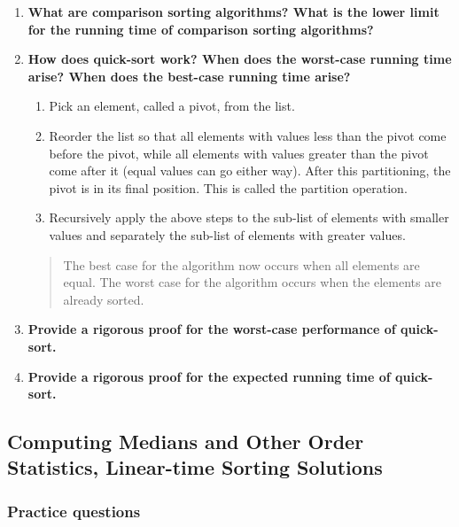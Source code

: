 \documentclass[a4paper,11pt]{article}
\begin{document}
\begin{enumerate}
\def\labelenumi{\arabic{enumi}.}
\item
  \textbf{What are comparison sorting algorithms? What is the lower
  limit for the running time of comparison sorting algorithms?}
\item
  \textbf{How does quick-sort work? When does the worst-case running
  time arise? When does the best-case running time arise?}

  \begin{enumerate}
  \def\labelenumii{\arabic{enumii}.}
  \itemsep1pt\parskip0pt
  \item
    Pick an element, called a pivot, from the list.
  \item
    Reorder the list so that all elements with values less than the
    pivot come before the pivot, while all elements with values greater
    than the pivot come after it (equal values can go either way). After
    this partitioning, the pivot is in its final position. This is
    called the partition operation.
  \item
    Recursively apply the above steps to the sub-list of elements with
    smaller values and separately the sub-list of elements with greater
    values.
  \end{enumerate}

  \begin{quote}
  The best case for the algorithm now occurs when all elements are
  equal. The worst case for the algorithm occurs when the elements are
  already sorted.
  \end{quote}
\item
  \textbf{Provide a rigorous proof for the worst-case performance of
  quick-sort.}
\item
  \textbf{Provide a rigorous proof for the expected running time of
  quick-sort.}
\end{enumerate}

\subsection{Computing Medians and Other Order Statistics, Linear-time
Sorting
Solutions}\label{computing-medians-and-other-order-statistics-linear-time-sorting-solutions}

\subsubsection{Practice questions}\label{practice-questions-7}
\end{document}
